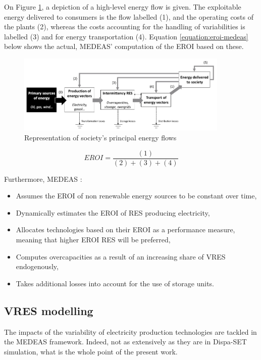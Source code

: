 On Figure \ref{fig:eroi-energy-flows}, a depiction of a high-level energy flow is given. The exploitable energy delivered to consumers is the flow labelled (1), and the operating costs of the plants (2), whereas the costs accounting for the handling of variabilities is labelled (3) and for energy transportation (4). Equation \ref{equation:eroi-medeas} below shows the actual, MEDEAS' computation of the EROI based on these.

\begin{figure}[h]
    \includegraphics[width=0.9\textwidth]{resources/images/EROI.png}
    \caption{Representation of society's principal energy flows\cite{medeas-eroi}}
    \label{fig:eroi-energy-flows}
\end{figure}

\begin{equation}
    EROI = \frac{(1)}{(2) + (3) + (4)}
    \label{equation:eroi-medeas}
\end{equation}

Furthermore, MEDEAS \cite{medeas-eroi}:
\begin{itemize}
    \item Assumes the EROI of non renewable energy sources to be constant over time,
    \item Dynamically estimates the EROI of RES producing electricity,
    \item Allocates technologies based on their EROI as a performance measure, meaning that higher EROI RES will be preferred,
    \item Computes overcapacities as a result of an increasing share of VRES endogenously,
    \item Takes additional losses into account for the use of storage units.
\end{itemize}

\subsection{VRES modelling}

The impacts of the variability of electricity production technologies are tackled in the MEDEAS framework. Indeed, not as extensively as they are in Dispa-SET simulation, what is the whole point of the present work.

